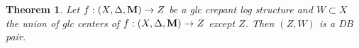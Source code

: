 \documentclass[11pt]{amsart}
\numberwithin{equation}{section}
\newcommand{\Mm}{{\bf{M}}}
\newcommand{\NN}{{\bf{N}}}
\newcommand{\Qq}{\mathbb{Q}}
\newcommand{\red}{\operatorname{red}}
\newcommand{\lf}{\lfloor}
\newcommand{\rf}{\rfloor}
\newcommand{\Oo}{\mathcal{O}}
\newtheorem{thm}{Theorem}[section]
\theoremstyle{definition}
\theoremstyle{definition}
\theoremstyle{definition}
\begin{document}
\begin{thm}\label{thm: (Z,W) is DB for glc crepant log structure}
  Let $f:(X,\Delta,\Mm)\to Z$ be a glc crepant log structure and
  $W\subset X$ the union of glc centers of $f:(X,\Delta,\Mm)\to Z$
  except $Z$. Then $(Z,W)$ is a DB pair.
\end{thm}
\begin{comment}
\begin{proof}
By Remark \ref{rem: to q coefficients}, we may assume that $(X,\Delta,\Mm)$ is a $\Qq$-g-pair. Let $(Z,\Delta_Z,\NN)/U$ be a glc $\mathbb Q$-g-pair induced by a canonical bundle formula$/U$ of $f: (X,\Delta,\Mm)\rightarrow Z$. By Lemma \ref{lem: glc centers come from cbf}, the glc centers of $(Z,\Delta_Z,\NN)$ are exactly the glc centers of $f: (X,\Delta,\Mm)\rightarrow Z$. Possibly replacing $(X,\Delta,\Mm)$ with a gdlt model of $(Z,\Delta_Z,\NN)$, we may assume that $f$ is birational and $(X,\Delta,\Mm)$ is $\mathbb Q$-factorial gdlt.
Then we have the following diagram
\begin{center}
$\xymatrix{
Y\ar@{->}[r]^{\pi}\ar@{->}[dr]^{g} & X\ar@{->}[d]^{f}\\
 & Z\\
}$
\end{center}
where $\pi$ is a log resolution such that $\Mm$ descends to $Y$ and $F:=g^{-1}(W)_{\red}$ is an snc divisor. Let
$$
K_Y+\Delta_Y+\Mm_Y:=\pi^*(K_X+\Delta+\Mm_X).
$$
and $D:=\Delta_Y^{=1}$. Since $\Mm_Y$ is nef$/Z$ and big$/Z$, there exists $0\le\Delta'_Y\sim_{\Qq,Z}\Mm_Y$ such that $(Y,\Delta_Y-D+\Delta'_Y)$ is sub-klt. Let $\bar{\Delta}_Y:=(\Delta_Y-D+\Delta'_Y)^{\ge0}$ and $E:=(\Delta_Y-D+\Delta'_Y)^{\le 0}$, then $\lf\bar{\Delta}_Y\rf=0$ and $E$ is exceptional over $Z$. Possibly replacing $Y$ with a higher resolution, we may assume that $D+E+\bar{\Delta}_Y$ is snc.

Since $E-D\ge-F$, we have natural maps:
$$
g_*\Oo_Y(-F)\to Rg_*\Oo_Y(-F)\to Rg_*\Oo_Y(E-D).
$$
Since $E-D\sim_{\Qq,Z}K_Y+\bar{\Delta}_Y$, by \cite[Theorem 10.41]{Kol13},
$$
Rg_*\Oo_Y(E-D)\simeq_{qis}\sum_{i}R^ig_*\Oo_Y(E-D)[i].
$$
Thus we get a morphism
$$
g_*\Oo_Y(-F)\to Rg_*\Oo_Y(-F)\to Rg_*\Oo_Y(E-D)\to g_*\Oo_Y(E-D).
$$
Note that
$$
g_*\Oo_Y(E-D)=g_*\Oo_Y(E-D)\cap g_*\Oo_Y(E)=g_*\Oo_Y(E-D)\cap g_*\Oo_Y=g_*\Oo_Y(-D).
$$
Since $D$ is reduced and $g(D)=W$, we have $g_*\Oo_Y(-D)=\mathcal{I}_W$, the ideal sheaf of $W$ in $Z$. Moreover, $g_*\Oo_Y=\mathcal{I}_W$ since $F$ is also reduced. Therefore, we get an isomorphism $\mathcal{I}_W=g_*\Oo_Y(-F)\to g_*\Oo(E-D)$, which implies that
$$
\rho: \mathcal{I}_W\simeq g_*\mathcal{I}_F\to Rg_*\mathcal{I}_F
$$
has a left inverse. Since $Y$ is smooth and $F$ is an snc divisor, we see that $(Y,F)$ is a DB pair, thus by \cite[Theorem 3.3]{Kov12} (cf. \cite[Theorem 6.27]{Kol13}), $(Z,W)$ is also a DB pair. \end{proof}
\end{comment}
\end{document}
